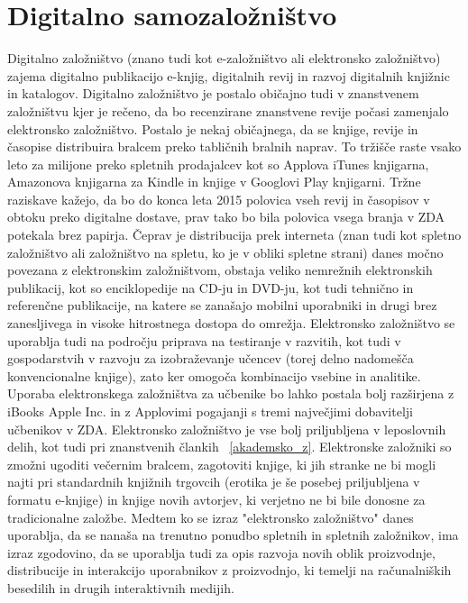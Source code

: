 \documentclass[a4paper, 12pt]{book}
\begin{document}
\chapter{Digitalno samozaložništvo}
\label{Dig_samozaloznistvo}
Digitalno založništvo (znano tudi kot e-založništvo ali elektronsko založništvo) zajema digitalno publikacijo e-knjig, digitalnih revij in razvoj digitalnih knjižnic in katalogov. Digitalno založništvo je postalo običajno tudi v znanstvenem založništvu kjer je rečeno, da bo recenzirane znanstvene revije počasi zamenjalo elektronsko založništvo. Postalo je nekaj običajnega, da se knjige, revije in časopise distribuira bralcem preko tabličnih bralnih naprav. To tržišče raste vsako leto za milijone preko spletnih prodajalcev kot so Applova iTunes knjigarna, Amazonova knjigarna za Kindle in knjige v Googlovi Play knjigarni.\cite{1} Tržne raziskave kažejo, da bo do konca leta 2015 polovica vseh revij in časopisov v obtoku preko digitalne dostave,\cite{2} prav tako bo bila polovica vsega branja v ZDA potekala brez papirja.\cite{3} Čeprav je distribucija prek interneta (znan tudi kot spletno založništvo ali založništvo na spletu, ko je v obliki spletne strani) danes močno povezana z elektronskim založništvom, obstaja veliko nemrežnih elektronskih publikacij, kot so enciklopedije na CD-ju in DVD-ju, kot tudi tehnično in referenčne publikacije, na katere se zanašajo mobilni uporabniki in drugi brez zanesljivega in visoke hitrostnega dostopa do omrežja. Elektronsko založništvo se uporablja tudi na področju priprava na testiranje v razvitih, kot tudi v gospodarstvih v razvoju za izobraževanje učencev (torej delno nadomešča konvencionalne knjige), zato ker omogoča kombinacijo vsebine in analitike. Uporaba elektronskega založništva za učbenike bo lahko postala bolj razširjena z iBooks Apple Inc. in z Applovimi pogajanji s tremi največjimi dobavitelji učbenikov v ZDA.\cite{4} Elektronsko založništvo je vse bolj priljubljena v leposlovnih delih, kot tudi pri znanstvenih člankih ~\ref{akademsko_z}. Elektronske založniki so zmožni ugoditi večernim bralcem, zagotoviti knjige, ki jih stranke ne bi mogli najti pri standardnih knjižnih trgovcih (erotika je še posebej priljubljena v formatu e-knjige) in knjige novih avtorjev, ki verjetno ne bi bile donosne za tradicionalne založbe. Medtem ko se izraz "elektronsko založništvo" danes uporablja, da se nanaša na trenutno ponudbo spletnih in spletnih založnikov, ima izraz zgodovino, da se uporablja tudi za opis razvoja novih oblik proizvodnje, distribucije in interakcijo uporabnikov z proizvodnjo, ki temelji na računalniških besedilih in drugih interaktivnih medijih. 
\end{document}

